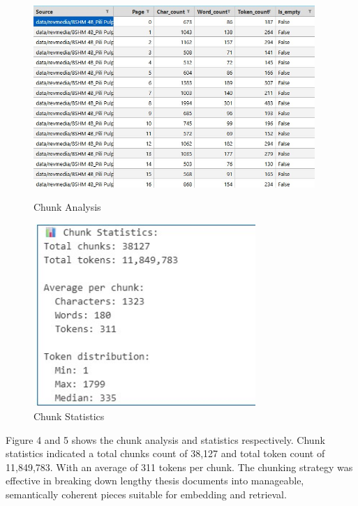 \begin{refsection}
\begin{figure}[h]
    \centering
    \begin{minipage}{0.48\textwidth}
        \centering
        \includegraphics[width=0.95\textwidth]{figures/chunk_analysis.jpg}
        \caption{Chunk Analysis}
    \end{minipage}\hfill
    \begin{minipage}{0.48\textwidth}
        \centering
        \includegraphics[width=0.75\textwidth]{figures/chunk_stat.jpg}
        \caption{Chunk Statistics}
    \end{minipage}
\end{figure}

Figure 4 and 5 shows the chunk analysis and statistics respectively. Chunk statistics indicated a total chunks count of 38,127 and total token count of 11,849,783. With an average of 311 tokens per chunk. The chunking strategy was effective in breaking down lengthy thesis documents into manageable, semantically coherent pieces suitable for embedding and retrieval.


\end{refsection}
